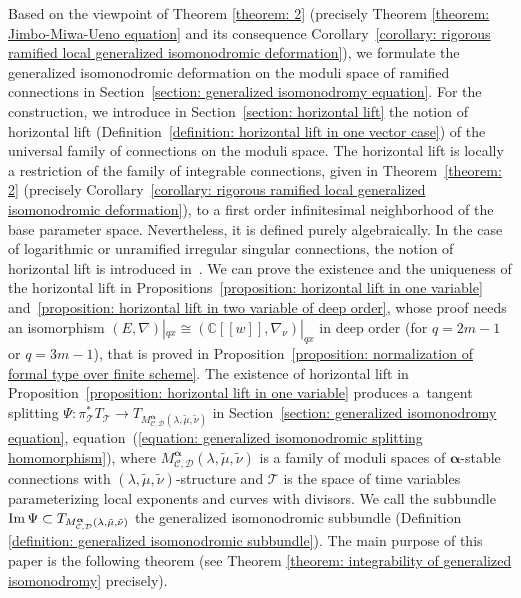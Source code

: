 \documentclass[pdftex]{sigma}
\numberwithin{equation}{section}
\newcommand\im{\mathop{\rm Im}\nolimits}
\newcommand{\balpha}{\boldsymbol \alpha}
\begin{document}
Based on the viewpoint of Theorem \ref{theorem: 2}
(precisely Theorem \ref{theorem: Jimbo-Miwa-Ueno equation} and its consequence
Corollary~\ref{corollary: rigorous ramified local generalized isomonodromic deformation}),
we formulate the generalized isomonodromic deformation
on the moduli space of ramified connections
in Section~\ref{section: generalized isomonodromy equation}.
For the construction, we introduce in Section~\ref{section: horizontal lift}
the notion of horizontal lift (Definition~\ref{definition: horizontal lift in one vector case})
of the universal family of connections
on the moduli space.
The horizontal lift is locally a restriction of the family of integrable connections, given in
Theorem~\ref{theorem: 2}
(precisely Corollary~\ref{corollary: rigorous ramified local generalized isomonodromic deformation}),
to a first order infinitesimal neighborhood of the base parameter space.
Nevertheless, it is defined purely algebraically.
In the case of logarithmic or unramified irregular singular connections,
the notion of horizontal lift is introduced in~\cite{Inaba-1,Inaba-3,Inaba-Saito}.
We can prove the existence and the uniqueness of the horizontal lift
in Propositions~\ref{proposition: horizontal lift in one variable}
and~\ref{proposition: horizontal lift in two variable of deep order},
whose proof needs an isomorphism
$(E,\nabla)|_{qx}\cong(\mathbb{C}[[w]],\nabla_{\nu})|_{qx}$
in deep order (for $q=2m-1$ or $q=3m-1$),
that is proved in Proposition~\ref{proposition: normalization of formal type over finite scheme}.
The existence of horizontal lift in Proposition~\ref{proposition: horizontal lift in one variable}
produces a~tangent splitting
$\Psi\colon \pi_{\mathcal T}^* T_{\mathcal T}
\longrightarrow
T_{M^{\balpha}_{{\mathcal C},{\mathcal D}}(\lambda,\tilde{\mu},\tilde{\nu})}$
in Section~\ref{section: generalized isomonodromy equation},
equation~(\ref{equation: generalized isomonodromic splitting homomorphism}),
where
$M^{\balpha}_{{\mathcal C},{\mathcal D}}(\lambda,\tilde{\mu},\tilde{\nu})$
is a family of moduli spaces of $\balpha$-stable connections
with $(\lambda,\tilde{\mu},\tilde{\nu})$-structure
and ${\mathcal T}$ is the space of time variables parameterizing
local exponents and curves with divisors.
We call the subbundle
$\im\Psi\subset T_{M^{\balpha}_{{\mathcal C},{\mathcal D}}(\lambda,\tilde{\mu},\tilde{\nu})}$
the generalized isomonodromic subbundle
(Definition \ref{definition: generalized isomonodromic subbundle}).
The main purpose of this paper is the following theorem
(see Theorem \ref{theorem: integrability of generalized isomonodromy} precisely).
\end{document}
